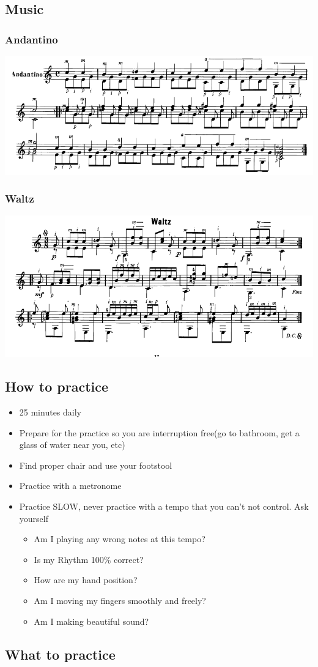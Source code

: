 \documentclass[11pt]{article}
\begin{document}
\subsection*{Music}
\label{sec:org954802b}
\subsubsection*{Andantino}
\label{sec:org592cfda}
\begin{center}
\includegraphics[width=.9\linewidth]{./Handouts.org_20240214_222412.png}
\end{center}
\subsubsection*{Waltz}
\label{sec:orgfd9a913}
\begin{center}
\includegraphics[width=.9\linewidth]{./Handouts.org_20240214_222357.png}
\end{center}
\subsection*{How to practice}
\label{sec:orge573f1a}
\begin{itemize}
\item 25 minutes daily
\item Prepare for the practice so you are interruption free(go to bathroom, get a glass of water near you, etc)
\item Find proper chair and use your footstool
\item Practice with a metronome
\item Practice SLOW, never practice with a tempo that you can't not control. Ask yourself
\begin{itemize}
\item Am I playing any wrong notes at this tempo?
\item Is my Rhythm 100\% correct?
\item How are my hand position?
\item Am I moving my fingers smoothly and freely?
\item Am I making beautiful sound?
\end{itemize}
\end{itemize}
\subsection*{What to practice}
\label{sec:org3f1739f}
\end{document}
